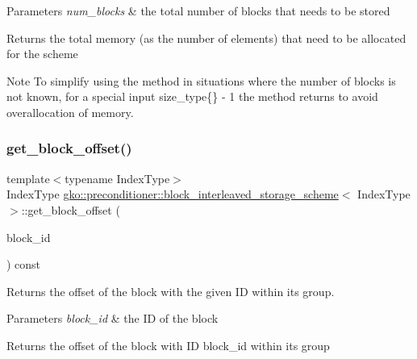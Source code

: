 \begin{DoxyParams}{Parameters}
{\em num\+\_\+blocks} & the total number of blocks that needs to be stored\\
\hline
\end{DoxyParams}
\begin{DoxyReturn}{Returns}
the total memory (as the number of elements) that need to be allocated for the scheme
\end{DoxyReturn}
\begin{DoxyNote}{Note}
To simplify using the method in situations where the number of blocks is not known, for a special input {\ttfamily size\+\_\+type\{\} -\/ 1} the method returns {} to avoid overallocation of memory. 
\end{DoxyNote}
\mbox{\label{structgko_1_1preconditioner_1_1block__interleaved__storage__scheme_a6384280dc1ad46fc1589d0b9165fd022}} 
\subsubsection{\texorpdfstring{get\+\_\+block\+\_\+offset()}{get\_block\_offset()}}
{\footnotesize\ttfamily template$<$typename Index\+Type$>$ \\
Index\+Type \hyperlink{structgko_1_1preconditioner_1_1block__interleaved__storage__scheme}{gko\+::preconditioner\+::block\+\_\+interleaved\+\_\+storage\+\_\+scheme}$<$ Index\+Type $>$\+::get\+\_\+block\+\_\+offset (\begin{DoxyParamCaption}\item[{Index\+Type}]{block\+\_\+id }\end{DoxyParamCaption}) const\hspace{0.3cm}{\ttfamily [noexcept]}}



Returns the offset of the block with the given ID within its group. 


\begin{DoxyParams}{Parameters}
{\em block\+\_\+id} & the ID of the block\\
\hline
\end{DoxyParams}
\begin{DoxyReturn}{Returns}
the offset of the block with ID {\ttfamily block\+\_\+id} within its group 
\end{DoxyReturn}


